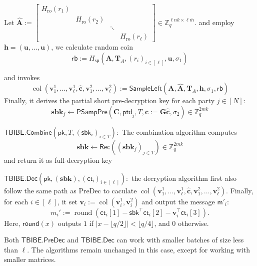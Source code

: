 Let $
    \hat{\mathbf{A}}
    :=
    \begin{bmatrix}
        H_{\mathrm{ro}}(r_1) & & \\
        & H_{\mathrm{ro}}(r_2) & \\
        & & \ddots \\
        & & & H_{\mathrm{ro}}(r_\ell)
    \end{bmatrix}
    \in \mathbb{Z}_q^{\ell n k \times \ell \bar{m}} .
$ and employ $\mathbf{h} = (\mathbf{u},\dots,\mathbf{u})$, we calculate random coin 
{
$$\mathsf{rb}:=H_{\mathsf{sp}}(\mathbf A,\mathbf T_A,(r_i)_{i\in[\ell]},\mathbf u,\sigma_1)$$}

and invokes 
{\setlength{\abovedisplayskip}{2pt}
\setlength{\abovedisplayshortskip}{2pt} $$\operatorname{col}(\mathbf v_1^1,\ldots,\mathbf v_\ell^1,\hat{\mathbf c},\mathbf v_1^2,\ldots,\mathbf v_\ell^2)
    := \mathsf{SampleLeft}(\mathbf A,\hat{\mathbf A},\mathbf T_A,\mathbf h,\sigma_1,\mathsf{rb})
$$}
Finally, it derives the partial short pre-decryption key for each party $j \in [N]:$
{\setlength{\abovedisplayskip}{2pt}
\setlength{\abovedisplayshortskip}{2pt}
$$\mathbf{sbk}_j\leftarrow \mathsf{PSampPre}(\mathbf C,\mathsf{ptd}_j,T,\mathbf c:=\mathbf G\hat{\mathbf c},\sigma_2) \in \mathbb{Z}_{q}^{2mk}$$}

\noindent$\mathsf{TBIBE.Combine}(\mathsf{pk},T,(\mathsf{sbk}_i)_{i\in T}):$ The combination algorithm computes
    $$\mathbf{sbk} \leftarrow \mathsf{Rec}((\mathbf{sbk}_j)_{j \in T}) \in \mathbb{Z}_q^{2mk}$$ 
and return it as full-decryption key

\noindent$\mathsf{TBIBE.Dec}(\mathsf{pk},(\mathbf{sbk}), (\mathsf{ct_i})_{i \in [\ell]}):$ the decryption algorithm first also follow the same path as PreDec to caculate $\operatorname{col}(\mathbf v_1^1,\ldots,\mathbf v_\ell^1,\hat{\mathbf c},\mathbf v_1^2,\ldots,\mathbf v_\ell^2)$. Finally, for each $i \in [\ell]$, it set $\mathbf v_i:=\operatorname{col}(\mathbf v_i^1,\mathbf v_i^2)$ and output the message $\mathsf{m}'_i$: 
$$m_i' := \operatorname{round}\!\left(
\mathsf{ct}_i[1]-\mathsf{sbk}^{\top}\mathsf{ct}_i[2]-\mathbf v_i^{\top}\mathsf{ct}_i[3]
\right).$$
Here, $\mathsf{round}(x)$ outputs $1$ if $|x - \lfloor q/2 \rfloor| < \lfloor q/4 \rfloor$, and $0$ otherwise.

\begin{remark}
Both $\mathsf{TBIBE.PreDec}$ and $\mathsf{TBIBE.Dec}$ can work with smaller batches of size less than $\ell$. The algorithms remain unchanged in this case, except for working with smaller matrices.
\end{remark}
